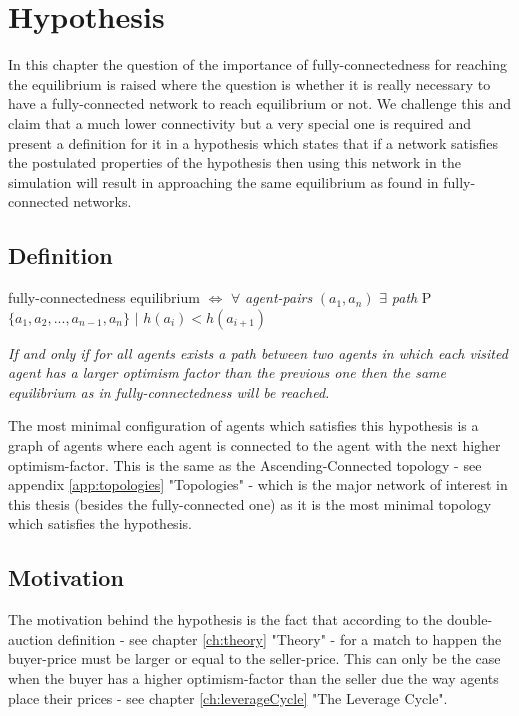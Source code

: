 \documentclass[Bachelorarbeit.tex]{subfiles}
\begin{document}
\graphicspath{{./figures/hypothesis/}}	%

\chapter{Hypothesis}
\label{ch:hypothesis}

In this chapter the question of the importance of fully-connectedness for reaching the equilibrium is raised where the question is whether it is really necessary to have a fully-connected network to reach equilibrium or not. We challenge this and claim that a much lower connectivity but a very special one is required and present a definition for it in a hypothesis which states that if a network satisfies the postulated properties of the hypothesis then using this network in the simulation will result in approaching the same equilibrium as found in fully-connected networks.

\section{Definition}

\begin{center}
fully-connectedness equilibrium $\iff$
\linebreak
$\forall$ \textit{agent-pairs} $(a_{1},a_{n})$ $\exists$ \textit{path} P $\{a_{1}, a_{2}, ... , a_{n-1}, a_{n}\}$ $|$ $h(a_{i}) < h(a_{i+1})$
\end{center}

\begin{center}
\textit{If and only if for all agents exists a path between two agents in which each visited agent has a larger optimism factor than the previous one then the same equilibrium as in fully-connectedness will be reached.}
\end{center}

The most minimal configuration of agents which satisfies this hypothesis is a graph of agents where each agent is connected to the agent with the next higher optimism-factor. This is the same as the Ascending-Connected topology - see appendix \ref{app:topologies} "Topologies" - which is the major network of interest in this thesis (besides the fully-connected one) as it is the most minimal topology which satisfies the hypothesis.

\section{Motivation}
The motivation behind the hypothesis is the fact that according to the double-auction definition - see chapter \ref{ch:theory} "Theory" - for a match to happen the buyer-price must be larger or equal to the seller-price. This can only be the case when the buyer has a higher optimism-factor than the seller due the way agents place their prices - see chapter \ref{ch:leverageCycle} "The Leverage Cycle".
\end{document}
